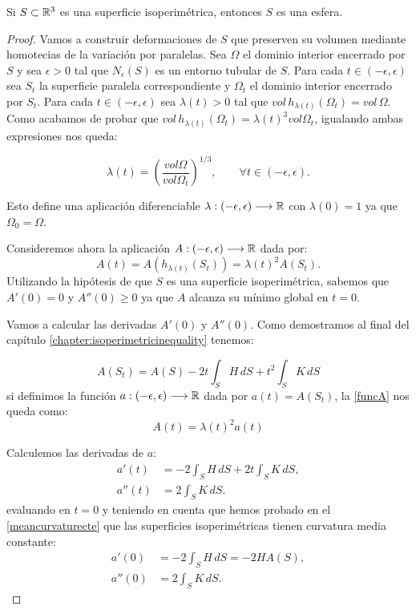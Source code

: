 \begin{theorem}
Si $S \subset \mathbb{R}^3$ es una superficie isoperimétrica, entonces $S$ es una esfera.
\end{theorem}
\begin{proof}
Vamos a construir deformaciones de $S$ que preserven su volumen mediante homotecias de la variación por paralelas. Sea $\Omega$ el dominio interior encerrado por $S$ y sea $\epsilon > 0$ tal que $N_\epsilon(S)$ es un entorno tubular de $S$. Para cada $t\in (-\epsilon, \epsilon)$ sea $S_t$ la superficie paralela correspondiente y $\Omega_t$ el dominio interior encerrado por $S_t$. Para cada $t\in (-\epsilon, \epsilon)$ sea $\lambda(t) > 0$ tal que $vol \, h_{\lambda(t)} (\Omega_t) = vol \, \Omega$. Como acabamos de probar que $vol \, h_{\lambda(t)}(\Omega_t) = \lambda(t)^3 vol \Omega_t$, igualando ambas expresiones nos queda:

\begin{equation*}\label{lambdafunction}
    \lambda(t) = \left( \frac{vol \Omega}{vol \Omega_t} \right) ^{1/3}, \qquad \forall t \in (-\epsilon, \epsilon).
\end{equation*}

Esto define una aplicación diferenciable $\lambda: (-\epsilon, \epsilon) \longrightarrow \mathbb{R}$ con $\lambda(0) = 1$ ya que $\Omega_0 = \Omega$. 

Consideremos ahora la aplicación $A: (-\epsilon, \epsilon) \longrightarrow \mathbb{R}$ dada por:
%
\begin{equation}\label{funcA}
    A(t) = A(h_{\lambda(t)} (S_t)) = \lambda(t)^2 A(S_t).
\end{equation}
%
Utilizando la hipótesis de que $S$ es una superficie isoperimétrica, sabemos que $A'(0) = 0$ y $A''(0) \geq 0$ ya que $A$ alcanza su mínimo global en $t=0$.

Vamos a calcular las derivadas $A'(0)$ y $A''(0)$. Como demostramos al final del capítulo \ref{chapter:isoperimetricinequality} tenemos:

\begin{equation*}
    A(S_t) = A(S) -2t\int_{S} H \, dS + t^2\int_{S} K \, dS
\end{equation*}
%
si definimos la función $a: (-\epsilon, \epsilon) \longrightarrow \mathbb{R}$ dada por $a(t) = A(S_t)$, la \autoref{funcA} nos queda como:
%
\begin{equation}
    A(t) = \lambda(t)^2 a(t)
\end{equation}

Calculemos las derivadas de $a$:
%
\begin{align*}
    a'(t) &= -2\int_{S} H \, dS + 2t\int_{S} K \, dS, \\
    a''(t) &= 2\int_{S} K \, dS.
\end{align*}
%
evaluando en $t=0$ y teniendo en cuenta que hemos probado en el \autoref{meancurvaturecte} que las superficies isoperimétricas tienen curvatura media constante:
%
\begin{align*}
    a'(0) &= -2\int_{S} H \, dS = -2HA(S), \\
    a''(0) &= 2\int_{S} K \, dS.
\end{align*}


\end{proof}
